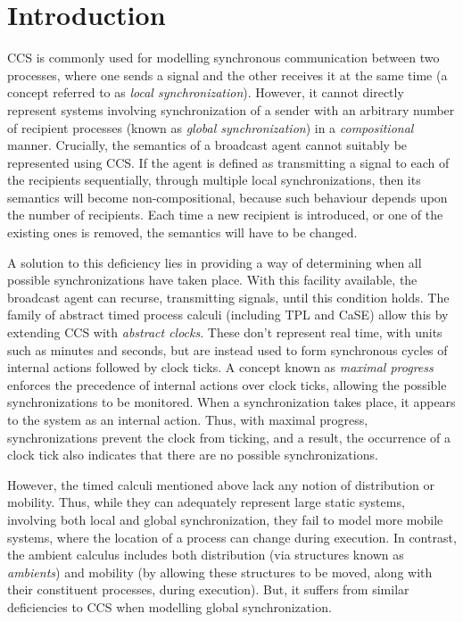 \chapter{Introduction}
\label{introduction}

CCS \cite{milner:ccs} is commonly used for modelling synchronous
communication between two processes, where one sends a signal and the
other receives it at the same time (a concept referred to as
\emph{local synchronization}).  However, it cannot directly represent
systems involving synchronization of a sender with an arbitrary number
of recipient processes (known as \emph{global synchronization}) in a
\emph{compositional} manner.  Crucially, the semantics of a broadcast
agent cannot suitably be represented using CCS.  If the agent is
defined as transmitting a signal to each of the recipients
sequentially, through multiple local synchronizations, then its
semantics will become non-compositional, because such behaviour
depends upon the number of recipients.  Each time a new recipient is
introduced, or one of the existing ones is removed, the semantics will
have to be changed.

A solution to this deficiency lies in providing a way of determining
when all possible synchronizations have taken place.  With this
facility available, the broadcast agent can recurse, transmitting
signals, until this condition holds. The family of abstract timed
process calculi (including TPL\cite{hennessy:tpl} and CaSE\cite{CaSE})
allow this by extending CCS with \emph{abstract clocks}.  These don't
represent real time, with units such as minutes and seconds, but are
instead used to form synchronous cycles of internal actions followed
by clock ticks.  A concept known as \emph{maximal progress} enforces
the precedence of internal actions over clock ticks, allowing the
possible synchronizations to be monitored.  When a synchronization
takes place, it appears to the system as an internal action.  Thus,
with maximal progress, synchronizations prevent the clock from
ticking, and a result, the occurrence of a clock tick also indicates
that there are no possible synchronizations.

However, the timed calculi mentioned above lack any notion of
distribution or mobility. Thus, while they can adequately represent
large static systems, involving both local and global synchronization,
they fail to model more mobile systems, where the location of a
process can change during execution.  In contrast, the ambient
calculus \cite{amb} includes both distribution (via structures known
as \emph{ambients}) and mobility (by allowing these structures to be
moved, along with their constituent processes, during execution). But,
it suffers from similar deficiencies to CCS when modelling global
synchronization.

